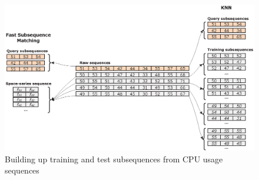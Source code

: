 \begin{figure}[!h]
\centering
\includegraphics[scale=0.60]{Figures/TrainTestSet}
\caption{Building up training and test subsequences from CPU usage sequences}
\label{fig:train_test_set}
\end{figure}






